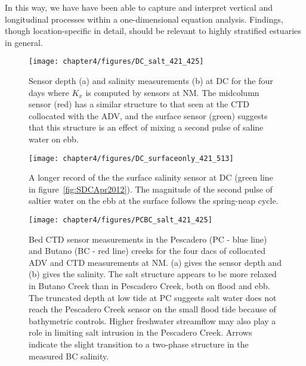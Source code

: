 In this way, we have have been able to capture and interpret vertical and longitudinal processes within a one-dimensional equation analysis. Findings, though location-specific in detail, should be relevant to highly stratified estuaries in general. 






\begin{figure}
	\texttt{[image: chapter4/figures/DC\_salt\_421\_425]}
	\caption{Sensor depth (a) and salinity measurements (b) at DC for the four days where $K_x$ is computed by sensors at NM. The midcolumn sensor (red) has a similar structure to that seen at the CTD collocated with the ADV, and the surface sensor (green) suggests that this structure is an effect of mixing a second pulse of saline water on ebb.} \label{fig:SDCApr2012} \label{fig:DC_salt_421_425}
\end{figure}


\begin{figure}
	\texttt{[image: chapter4/figures/DC\_surfaceonly\_421\_513]}
	\caption{A longer record of the the surface salinity sensor at DC (green line in figure~\ref{fig:SDCApr2012}). The magnitude of the second pulse of saltier water on the ebb at the surface follows the spring-neap cycle.} \label{fig:SsurfLT}
\end{figure}


\begin{figure}
	\texttt{[image: chapter4/figures/PCBC\_salt\_421\_425]}
	\caption{Bed CTD sensor measurements in the Pescadero (PC - blue line) and Butano (BC  - red line) creeks for the four dacs of collocated ADV and CTD measurements at NM. (a) gives the sensor depth and (b) gives the salinity. The salt structure appears to be more relaxed in Butano Creek than in Pescadero Creek, both on flood and ebb. The truncated depth at low tide at PC suggests salt water does not reach the Pescadero Creek sensor on the small flood tide because of bathymetric controls. Higher freshwater streamflow may also play a role in limiting salt intrusion in the Pescadero Creek. Arrows indicate the slight transition to a two-phase structure in the measured BC salinity.} \label{fig:PCBC421:425}
\end{figure}



